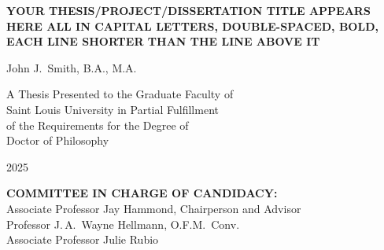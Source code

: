 \documentclass[12pt,oneside]{book}
\newcommand{\thesistitle}{YOUR THESIS/PROJECT/DISSERTATION TITLE APPEARS HERE ALL IN CAPITAL LETTERS, DOUBLE-SPACED, BOLD, EACH LINE SHORTER THAN THE LINE ABOVE IT}
\newcommand{\authorname}{John J.\ Smith, B.A., M.A.}
\newcommand{\degree}{Doctor of Philosophy}
\newcommand{\graduationyear}{2025}
\newcommand{\committeelist}{%
Associate Professor Jay Hammond, Chairperson and Advisor\\[1em]
Professor J.\,A.\ Wayne Hellmann, O.F.M.\ Conv.\\[1em]
Associate Professor Julie Rubio}
\begin{document}
\begin{titlepage}
\begin{center}
\doublespacing
{\Large\bfseries \thesistitle\par}
\vfill
\authorname\par
\vfill
A Thesis Presented to the Graduate Faculty of\\
Saint Louis University in Partial Fulfillment\\
of the Requirements for the Degree of\\[1em]
\degree\par
\vfill
\graduationyear
\end{center}
\end{titlepage}



\thispagestyle{empty}
\noindent\textbf{COMMITTEE IN CHARGE OF CANDIDACY:}\\[2em]
\committeelist
\clearpage



\tableofcontents\clearpage
\listoftables\clearpage      %
\listoffigures\clearpage     %

\mainmatter
\doublespacing
\raggedright
\end{document}
